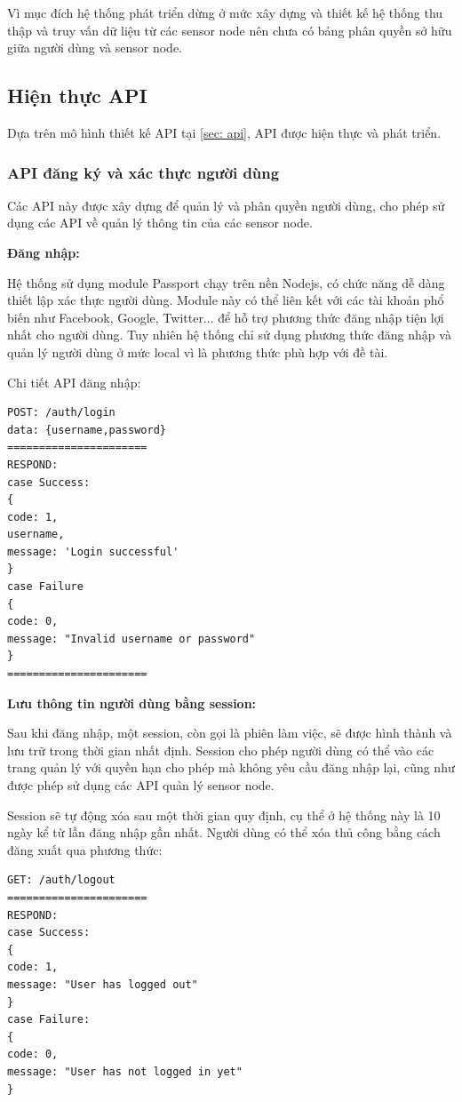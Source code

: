 Vì mục đích hệ thống phát triển dừng ở mức xây dựng và thiết kế hệ thống thu thập và truy vấn dữ liệu từ các sensor node nên chưa có bảng phân quyền sở hữu giữa người dùng và sensor node.
\subsection{Hiện thực API}
Dựa trên mô hình thiết kế API tại \ref{sec: api}, API được hiện thực và phát triển.


\subsubsection*{API đăng ký và xác thực người dùng}

Các API này được xây dựng để quản lý và phân quyền người dùng, cho phép sử dụng các API về quản lý thông tin của các sensor node.

\textbf{Đăng nhập:}

Hệ thống sử dụng module Passport chạy trên nền Nodejs, có chức năng dễ dàng thiết lập xác thực người dùng. Module này có thể liên kết với các tài khoản phổ biến như Facebook, Google, Twitter... để hỗ trợ phương thức đăng nhập tiện lợi nhất cho người dùng. Tuy nhiên hệ thống chỉ sử dụng phương thức đăng nhập và quản lý người dùng ở mức local vì là phương thức phù hợp với đề tài.

Chi tiết API đăng nhập:
\begin{Verbatim}[xleftmargin=2em]
POST: /auth/login
data: {username,password}
======================
RESPOND:
case Success:
{
code: 1,
username,
message: 'Login successful'
}
case Failure	
{
code: 0,
message: "Invalid username or password"
}
======================
\end{Verbatim}

\textbf{Lưu thông tin người dùng bằng session:}

Sau khi đăng nhập, một session, còn gọi là phiên làm việc, sẽ được hình thành và lưu trữ trong thời gian nhất định. Session cho phép người dùng có thể vào các trang quản lý với quyền hạn cho phép mà không yêu cầu đăng nhập lại, cũng như được phép sử dụng các API quản lý sensor node.

Session sẽ tự động xóa sau một thời gian quy định, cụ thể ở hệ thống này là 10 ngày kể từ lần đăng nhập gần nhất. Người dùng có thể xóa thủ công bằng cách đăng xuất qua phương thức:
\begin{Verbatim}[xleftmargin=2em]
GET: /auth/logout
======================
RESPOND:
case Success:
{
code: 1,
message: "User has logged out"
}
case Failure:	
{
code: 0,
message: "User has not logged in yet"
}	
\end{Verbatim}

